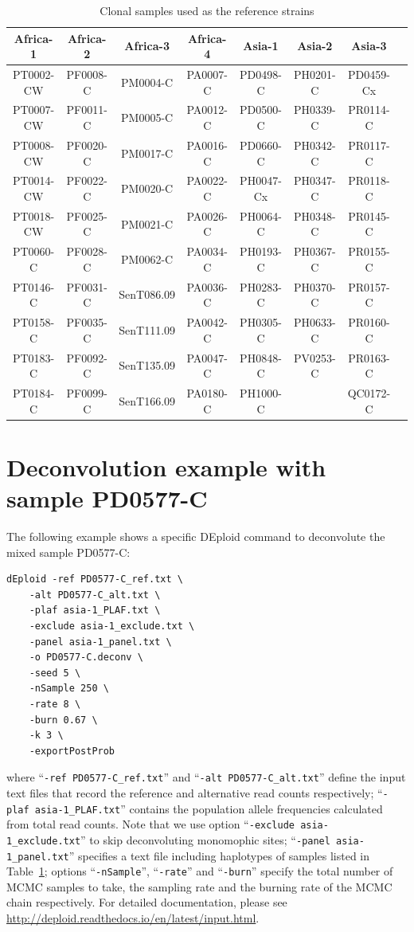 \documentclass{article}
\begin{document}
\begin{table}[ht]
\centering
\begin{tabular}{|c|c|c|c|c|c|c|c|}
\hline\hline
Africa-1	&	Africa-2	&	Africa-3	&	Africa-4	&	Asia-1	&	Asia-2	&	Asia-3	\\
\hline
PT0002-CW	&	PF0008-C	&	PM0004-C	&	PA0007-C	&	PD0498-C	&	PH0201-C	&	PD0459-Cx	\\
PT0007-CW	&	PF0011-C	&	PM0005-C	&	PA0012-C	&	PD0500-C	&	PH0339-C	&	PR0114-C	\\
PT0008-CW	&	PF0020-C	&	PM0017-C	&	PA0016-C	&	PD0660-C	&	PH0342-C	&	PR0117-C	\\
PT0014-CW	&	PF0022-C	&	PM0020-C	&	PA0022-C	&	PH0047-Cx	&	PH0347-C	&	PR0118-C	\\
PT0018-CW	&	PF0025-C	&	PM0021-C	&	PA0026-C	&	PH0064-C	&	PH0348-C	&	PR0145-C	\\
PT0060-C	&	PF0028-C	&	PM0062-C	&	PA0034-C	&	PH0193-C	&	PH0367-C	&	PR0155-C	\\
PT0146-C	&	PF0031-C	&	SenT086.09	&	PA0036-C	&	PH0283-C	&	PH0370-C	&	PR0157-C	\\
PT0158-C	&	PF0035-C	&	SenT111.09	&	PA0042-C	&	PH0305-C	&	PH0633-C	&	PR0160-C	\\
PT0183-C	&	PF0092-C	&	SenT135.09	&	PA0047-C	&	PH0848-C	&	PV0253-C	&	PR0163-C	\\
PT0184-C	&	PF0099-C	&	SenT166.09	&	PA0180-C	&	PH1000-C	&		&	QC0172-C	\\
\hline\hline
\end{tabular}
\caption{Clonal samples used as the reference strains}\label{tab:panelSamples}
\end{table}


\section{Deconvolution example with sample PD0577-C}

The following example shows a specific {\textmd DEploid} command to deconvolute the mixed sample {\textmd PD0577-C}:
\linespread{1}
\begin{lstlisting}
dEploid -ref PD0577-C_ref.txt \
    -alt PD0577-C_alt.txt \
    -plaf asia-1_PLAF.txt \
    -exclude asia-1_exclude.txt \
    -panel asia-1_panel.txt \
    -o PD0577-C.deconv \
    -seed 5 \
    -nSample 250 \
    -rate 8 \
    -burn 0.67 \
    -k 3 \
    -exportPostProb
\end{lstlisting}
\linespread{1.5}
where ``{\tt -ref PD0577-C\_ref.txt}'' and ``{\tt -alt PD0577-C\_alt.txt}'' define the input text files that record the reference and alternative read counts respectively; ``{\tt -plaf asia-1\_PLAF.txt}'' contains the population allele frequencies calculated from total read counts. Note that we use option ``{\tt -exclude asia-1\_exclude.txt}'' to skip deconvoluting monomophic sites; ``{\tt -panel asia-1\_panel.txt}'' specifies a text file including haplotypes of samples listed in Table~\ref{tab:panelSamples}; options ``{\tt -nSample}'', ``{\tt -rate}'' and ``{\tt -burn}'' specify the total number of MCMC samples to take, the sampling rate and the burning rate of the MCMC chain respectively. For detailed documentation, please see \url{http://deploid.readthedocs.io/en/latest/input.html}.
\end{document}
